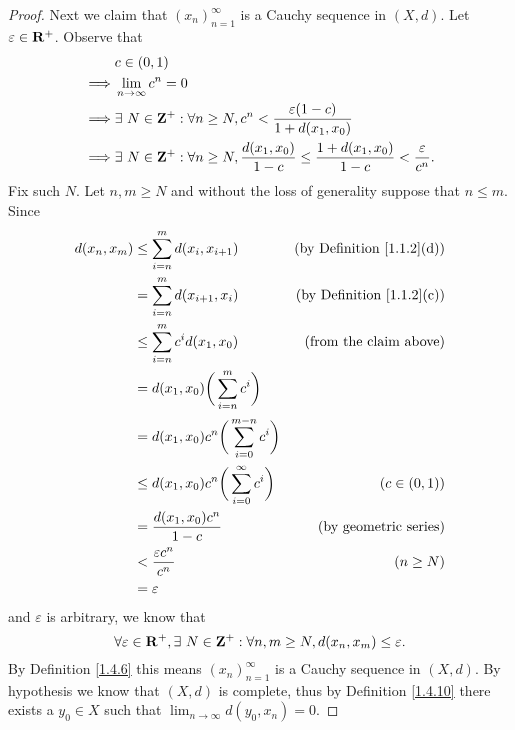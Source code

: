 \begin{proof}
    Next we claim that \((x_n)_{n = 1}^\infty\) is a Cauchy sequence in \((X, d)\).
    Let \(\varepsilon \in \mathbf{R}^+\).
    Observe that
    \begin{align*}
                 & c \in (0, 1)                                                                                                                    \\
        \implies & \lim_{n \to \infty} c^n = 0                                                                                                     \\
        \implies & \exists\ N \in \mathbf{Z}^+ : \forall n \geq N, c^n < \frac{\varepsilon (1 - c)}{1 + d(x_1, x_0)}                                       \\
        \implies & \exists\ N \in \mathbf{Z}^+ : \forall n \geq N, \frac{d(x_1, x_0)}{1 - c} \leq \frac{1 + d(x_1, x_0)}{1 - c} < \frac{\varepsilon}{c^n}.
    \end{align*}
    Fix such \(N\).
    Let \(n, m \geq N\) and without the loss of generality suppose that \(n \leq m\).
    Since
    \begin{align*}
        d(x_n, x_m) & \leq \sum_{i = n}^m d(x_i, x_{i + 1})                    & \text{(by Definition \ref{1.1.2}(d))} \\
                    & = \sum_{i = n}^m d(x_{i + 1}, x_i)                       & \text{(by Definition \ref{1.1.2}(c))} \\
                    & \leq \sum_{i = n}^m c^i d(x_1, x_0)                      & \text{(from the claim above)}         \\
                    & = d(x_1, x_0) \bigg(\sum_{i = n}^m c^i\bigg)                                                     \\
                    & = d(x_1, x_0) c^n \bigg(\sum_{i = 0}^{m - n} c^i\bigg)                                           \\
                    & \leq d(x_1, x_0) c^n \bigg(\sum_{i = 0}^\infty c^i\bigg) & (c \in (0, 1))                        \\
                    & = \frac{d(x_1, x_0) c^n}{1 - c}                          & \text{(by geometric series)}          \\
                    & < \frac{\varepsilon c^n}{c^n}                            & (n \geq N)                            \\
                    & = \varepsilon
    \end{align*}
    and \(\varepsilon\) is arbitrary, we know that
    \[
        \forall \varepsilon \in \mathbf{R}^+, \exists\ N \in \mathbf{Z}^+ : \forall n, m \geq N, d(x_n, x_m) \leq \varepsilon.
    \]
    By Definition \ref{1.4.6} this means \((x_n)_{n = 1}^\infty\) is a Cauchy sequence in \((X, d)\).
    By hypothesis we know that \((X, d)\) is complete, thus by Definition \ref{1.4.10} there exists a \(y_0 \in X\) such that \(\lim_{n \to \infty} d(y_0, x_n) = 0\).


\end{proof}
